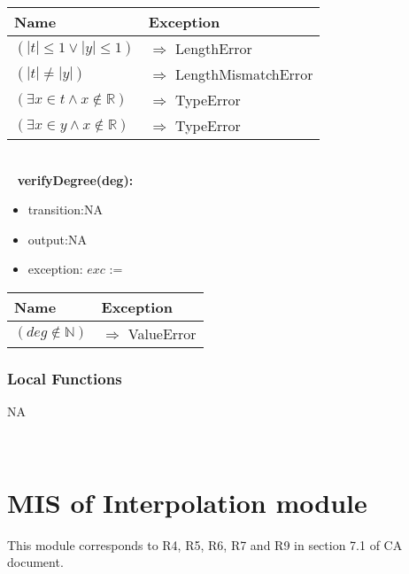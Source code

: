 \documentclass[12pt, titlepage]{article}
\begin{document}
\begin{tabular}{p{10cm} p{6.75cm}}
	
	\toprule
	\textbf{Name}&\textbf{Exception}\\
	\midrule


$ (|t| \leq 1 \lor |y| \leq 1)$ & $\Longrightarrow$ LengthError\\
$ (|t| \neq |y|)$ & $\Longrightarrow$ LengthMismatchError\\
$ (\exists x \in t \land  x \notin \mathbb{R} )$ & $\Longrightarrow$ TypeError\\
$ (\exists x \in y \land  x \notin \mathbb{R} )$ & $\Longrightarrow$ TypeError\\


\bottomrule
\end{tabular}\\

~\newline
\noindent \textbf{verifyDegree(deg):}
\begin{itemize}
	\item transition:NA
	\item output:NA 
	\item exception: $exc$ := 
\end{itemize}

\begin{tabular}{p{12cm} p{4.75cm}}
	
	\toprule
	\textbf{Name}&\textbf{Exception}\\
	\midrule
	
	
	$ (deg \notin \mathbb{N})$ & $\Longrightarrow$ ValueError\\

	
	\bottomrule
\end{tabular}


\subsubsection{Local Functions}

NA




~\newpage

\section{MIS of Interpolation module} \label{mInterp}

This module corresponds to R4, R5, 
R6, R7 and R9
in section 7.1 of CA document.
\end{document}
